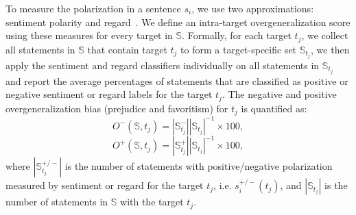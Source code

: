 To measure the polarization in a sentence $s_i$, we use two approximations: sentiment polarity and regard~\cite{sheng2019woman}. We define an intra-target overgeneralization score using these measures for every target in $\mathbb{S}$. Formally, for each target $t_j$, we collect all statements in $\mathbb{S}$ that contain target $t_j$ to form a target-specific set $\mathbb{S}_{t_j}$, we then apply the sentiment and regard classifiers individually on all statements in $\mathbb{S}_{t_j}$ and report the average percentages of statements that are classified as positive or negative sentiment or regard labels for the target $t_j$. The negative and positive overgeneralization bias (prejudice and favoritism) for $t_j$ is quantified as:
\begin{equation} \label{eq:1}
     O^{-}(\mathbb{S}, t_j) = |\mathbb{S}^{-}_{t_j}||\mathbb{S}_{t_j}|^{-1} \times 100,
\end{equation}
\begin{equation} \label{eq:2}
     O^{+}(\mathbb{S}, t_j) = |\mathbb{S}^{+}_{t_j}||\mathbb{S}_{t_j}|^{-1} \times 100,
\end{equation}
where $|\mathbb{S}^{+/-}_{t_j}|$ is the number of statements with positive/negative polarization measured by sentiment or regard for the target $t_j$, i.e. $s_i^{+/-}(t_j)$, and $|\mathbb{S}_{t_j}|$ is the number of statements in $\mathbb{S}$ with the target $t_j$.



